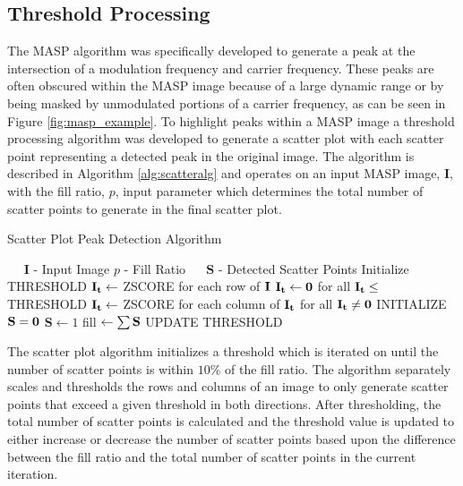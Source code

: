 \subsection[Threshold Processing]{Threshold Processing}
\label{Threshold Processing}

The MASP algorithm was specifically developed to generate a peak at the intersection of a modulation frequency and carrier frequency.  These peaks are often obscured within the MASP image because of a large dynamic range or by being masked by unmodulated portions of a carrier frequency, as can be seen in Figure \ref{fig:masp_example}.  To highlight peaks within a MASP image a threshold processing algorithm was developed to generate a scatter plot with each scatter point representing a detected peak in the original image.  The algorithm is described in Algorithm \ref{alg:scatteralg} and operates on an input MASP image, $\mathbf{I}$, with the fill ratio, $p$, input parameter which determines the total number of scatter points to generate in the final scatter plot.   

\begin{algorithm}
	\caption{Scatter Plot Peak Detection Algorithm} \label{alg:scatteralg}
	\scriptsize
	\begin{algorithmic}[1]
		\Require~~
		\Statex $\mathbf{I}$ - Input Image
		\Statex $p$ - Fill Ratio
		\Ensure~~
		\Statex $\mathbf{S}$ - Detected Scatter Points
		\Statex
		\Statex Initialize THRESHOLD 
			\State $\bf{I_t} \gets $ ZSCORE for each row of $\bf{I}$
			\State $\bf{I_t} \gets 0$ for all $\bf{I_t} \le$ THRESHOLD
			\State $\bf{I_t} \gets $ ZSCORE for each column of $\bf{I_t}$ for all $\bf{I_t} \ne 0$
			\State INITIALIZE $\bf{S} = 0$
				\State $\mathbf{S} \gets 1$
			\EndFor
			\State fill $ \gets \sum{\bf{S}}$
			\State UPDATE THRESHOLD
		\EndWhile
	\end{algorithmic}
\end{algorithm}

The scatter plot algorithm initializes a threshold which is iterated on until the number of scatter points is within $10\%$ of the fill ratio.  The algorithm separately scales and thresholds the rows and columns of an image to only generate scatter points that exceed a given threshold in both directions.  After thresholding, the total number of scatter points is calculated and the threshold value is updated to either increase or decrease the number of scatter points based upon the difference between the fill ratio and the total number of scatter points in the current iteration.

